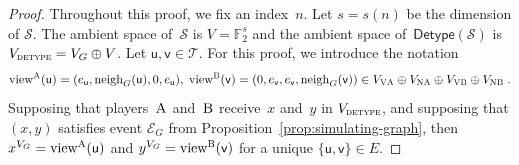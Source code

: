 \documentclass[11pt]{article}
\theoremstyle{definition}
\newcommand{\F}{\ensuremath{\mathbb{F}}}
\newcommand{\sampler}{\mathcal{S}}
\newcommand{\type}{\mathcal{T}}
\newcommand{\gamestyle}[1]{\ensuremath{\textsc{#1}}\xspace}
\newcommand{\labelstyle}[1]{\ensuremath{\textsc{#1}}\xspace}
\newcommand{\vertex}[1]{\labelstyle{V#1}}
\newcommand{\edge}[1]{\labelstyle{N#1}}
\newcommand{\tvarstyle}[1]{\mathsf{#1}}
\newcommand{\lvar}{\ensuremath{\tvarstyle{u}}}
\newcommand{\rvar}{\ensuremath{\tvarstyle{v}}}
\newcommand{\alice}{\labelstyle{A}}
\newcommand{\bob}{\labelstyle{B}}
\newcommand{\tmstyle}[1]{\ensuremath{\mathsf{#1}}}
\newcommand{\detype}{\tmstyle{Detype}}
\begin{document}
\begin{proof}
  Throughout this proof, we fix an index~$n$.
  Let $s = s(n)$ be the dimension of $\sampler$.
  The ambient space of~$\sampler$ is $V = \F_2^s$ and the ambient space
  of~$\detype(\sampler)$ is $V_{\gamestyle{detype}} = V_G \oplus V$.
  Let $\lvar, \rvar \in \type$.
  For this proof, we introduce the notation
  \begin{equation*}
    \mathrm{view}^\alice(\lvar) =
    (e_\lvar, \mathrm{neigh}_G(\lvar), 0, e_\lvar),\;
    \mathrm{view}^\bob(\rvar) =
    (0, e_\rvar, e_\rvar, \mathrm{neigh}_G(\rvar))
    \in V_{\vertex{\alice}} \oplus V_{\edge{\alice}}
    \oplus V_{\vertex{\bob}} \oplus V_{\edge{\bob}}\;.
\end{equation*}
Supposing that players~\alice and~\bob receive~$x$ and~$y$ in
$V_{\gamestyle{detype}}$, and supposing that $(x, y)$ satisfies event
$\mathcal{E}_G$ from Proposition~\ref{prop:simulating-graph}, then $x^{V_G} =
\mathrm{view}^\alice(\lvar)$ and $y^{V_G} = \mathrm{view}^\bob(\rvar)$ for a unique
$\{\lvar, \rvar\} \in E$.


\end{proof}
\end{document}
